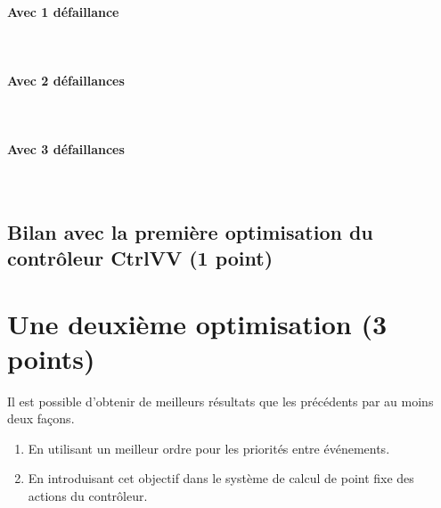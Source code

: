 \documentclass[a4paper]{book}
\begin{document}
\paragraph{Avec 1 défaillance}\ \\


\paragraph{Avec 2 défaillances}\ \\


\paragraph{Avec 3 défaillances}\ \\


\subsection{Bilan avec la première optimisation du contrôleur CtrlVV (1 point)}

\section{Une deuxième optimisation (3 points)}
Il est possible d'obtenir de meilleurs résultats que les précédents par au moins deux façons.
\begin{enumerate}
\item En utilisant un meilleur ordre pour les priorités entre événements.
\item En introduisant cet objectif dans le système de calcul de point fixe des actions du contrôleur.
\end{enumerate}
\end{document}
